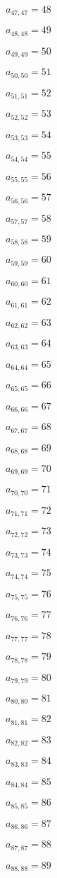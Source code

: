 \documentclass[a4paper,12pt]{article}
\begin{document}
$a _{ 47, 47 } = 48$

$a _{ 48, 48 } = 49$

$a _{ 49, 49 } = 50$

$a _{ 50, 50 } = 51$

$a _{ 51, 51 } = 52$

$a _{ 52, 52 } = 53$

$a _{ 53, 53 } = 54$

$a _{ 54, 54 } = 55$

$a _{ 55, 55 } = 56$

$a _{ 56, 56 } = 57$

$a _{ 57, 57 } = 58$

$a _{ 58, 58 } = 59$

$a _{ 59, 59 } = 60$

$a _{ 60, 60 } = 61$

$a _{ 61, 61 } = 62$

$a _{ 62, 62 } = 63$

$a _{ 63, 63 } = 64$

$a _{ 64, 64 } = 65$

$a _{ 65, 65 } = 66$

$a _{ 66, 66 } = 67$

$a _{ 67, 67 } = 68$

$a _{ 68, 68 } = 69$

$a _{ 69, 69 } = 70$

$a _{ 70, 70 } = 71$

$a _{ 71, 71 } = 72$

$a _{ 72, 72 } = 73$

$a _{ 73, 73 } = 74$

$a _{ 74, 74 } = 75$

$a _{ 75, 75 } = 76$

$a _{ 76, 76 } = 77$

$a _{ 77, 77 } = 78$

$a _{ 78, 78 } = 79$

$a _{ 79, 79 } = 80$

$a _{ 80, 80 } = 81$

$a _{ 81, 81 } = 82$

$a _{ 82, 82 } = 83$

$a _{ 83, 83 } = 84$

$a _{ 84, 84 } = 85$

$a _{ 85, 85 } = 86$

$a _{ 86, 86 } = 87$

$a _{ 87, 87 } = 88$

$a _{ 88, 88 } = 89$
\end{document}
